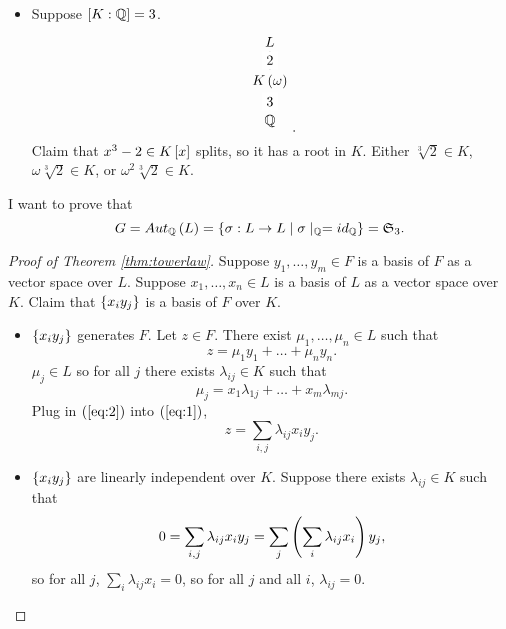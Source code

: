 \begin{example}
\begin{itemize}
$$$$
Either $ \omega \in K $, that is $ \Q\rb{\omega} \subset K $, so by Theorem \ref{thm:towerlaw} $ \Q\rb{\omega} = K $. Or $ \omega \notin K $ gives $ \sb{K\rb{\omega} : K} = 2 $, so $ \sb{K\rb{\omega} : \Q} = 4 $ contradicts the tower law for $ \Q \subset K\rb{\omega} \subset L $.
\item Suppose $ \sb{K : \Q} = 3 $.
$$
\begin{tikzpicture}
\node (L) at (0, 1) {$ L $};
\node (K) at (0, 0) {$ K\rb{\omega} $};
\node (Q) at (0, -1) {$ \Q $};
\draw (L) -- node[fill=white]{2} (K) -- node[fill=white]{3} (Q);
\end{tikzpicture}.
$$
Claim that $ x^3 - 2 \in K\sb{x} $ splits, so it has a root in $ K $. Either $ \sqrt[3]{2} \in K $, $ \omega\sqrt[3]{2} \in K $, or $ \omega^2\sqrt[3]{2} \in K $.
\end{itemize}
I want to prove that
$$ G = Aut_\Q\rb{L} = \cb{\sigma : L \to L \mid \sigma \mid_\Q = id_\Q} = \mathfrak{S}_3. $$
\end{example}


\begin{proof}[Proof of Theorem \ref{thm:towerlaw}]
Suppose $ y_1, \dots, y_m \in F $ is a basis of $ F $ as a vector space over $ L $. Suppose $ x_1, \dots, x_n \in L $ is a basis of $ L $ as a vector space over $ K $. Claim that $ \cb{x_iy_j} $ is a basis of $ F $ over $ K $.
\begin{itemize}
\item $ \cb{x_iy_j} $ generates $ F $. Let $ z \in F $. There exist $ \mu_1, \dots, \mu_n \in L $ such that
\begin{equation}
\label{eq:1}
z = \mu_1y_1 + \dots + \mu_ny_n.
\end{equation}
$ \mu_j \in L $ so for all $ j $ there exists $ \lambda_{ij} \in K $ such that
\begin{equation}
\label{eq:2}
\mu_j = x_1\lambda_{1j} + \dots + x_m\lambda_{mj}.
\end{equation}
Plug in $ \rb{\ref{eq:2}} $ into $ \rb{\ref{eq:1}} $,
$$ z = \sum_{i, j} \lambda_{ij}x_iy_j. $$
\item $ \cb{x_iy_j} $ are linearly independent over $ K $. Suppose there exists $ \lambda_{ij} \in K $ such that
$$ 0 = \sum_{i, j} \lambda_{ij}x_iy_j = \sum_j \rb{\sum_i \lambda_{ij}x_i}y_j, $$
so for all $ j $, $ \sum_i \lambda_{ij}x_i = 0 $, so for all $ j $ and all $ i $, $ \lambda_{ij} = 0 $.
\end{itemize}
\end{proof}

